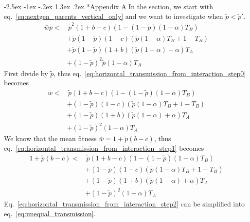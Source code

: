\documentclass[12pt]{extarticle}
\makeatletter
\renewcommand\section{\@startsection {section}{1}{\z@}%
     {-2.5ex \@plus -1ex \@minus -.2ex}%
     {1.3ex \@plus.2ex}%
    {\Large\bfseries}}
\makeatother
\begin{document}
\section*{Appendix A} %
In the section, we start with eq.~\ref{eq:nextgen_parents_vertical_only} and we want to investigate when $\tilde{p}< \tilde{p}'$. 
\begin{equation} 
\begin{split} \label{eq:horizontal_transmission_from_interaction_step0}
\bar{w}\tilde{p} < & \, \tilde{p}^2 (1+b-c) (1 - (1-\tilde{p}) (1-\alpha) T_B) \\
& + \tilde{p}(1-\tilde{p}) (1-c) (\tilde{p} (1-\alpha) T_B + 1 - T_B) \\
& + \tilde{p}(1-\tilde{p}) (1+b) (\tilde{p} (1-\alpha) + \alpha) T_A \\
& + (1-\tilde{p})^2 \tilde{p} (1-\alpha) T_A
\end{split}
\end{equation}
First divide by $\tilde{p}$, thus eq.~\ref{eq:horizontal_transmission_from_interaction_step0} becomes
\begin{equation} 
\begin{split} \label{eq:horizontal_transmission_from_interaction_step1}
  \bar{w} < & \, \tilde{p}(1+b-c) (1 - (1-\tilde{p}) (1-\alpha) T_B) \\
  & + (1-\tilde{p}) (1-c) (\tilde{p} (1-\alpha) T_B + 1 - T_B) \\
  & + (1-\tilde{p}) (1+b) (\tilde{p} (1-\alpha) + \alpha) T_A \\
  & + (1-\tilde{p})^2 (1-\alpha) T_A
\end{split}
\end{equation}
We know that the mean fitness $\bar{w} = 1 + \tilde{p}(b-c)$, thus eq.~\ref{eq:horizontal_transmission_from_interaction_step1} becomes
\begin{equation} 
\begin{split} \label{eq:horizontal_transmission_from_interaction_step2}
  1 + \tilde{p}(b-c) < & \, \tilde{p}(1+b-c) (1 - (1-\tilde{p}) (1-\alpha) T_B) \\
  & + (1-\tilde{p}) (1-c) (\tilde{p} (1-\alpha) T_B + 1 - T_B) \\
  & + (1-\tilde{p}) (1+b) (\tilde{p} (1-\alpha) + \alpha) T_A \\
  & + (1-\tilde{p})^2 (1-\alpha) T_A
\end{split}
\end{equation}
Eq.~\ref{eq:horizontal_transmission_from_interaction_step2} can be simplified into eq.~\ref{eq:unequal_transmission}.
\end{document}
